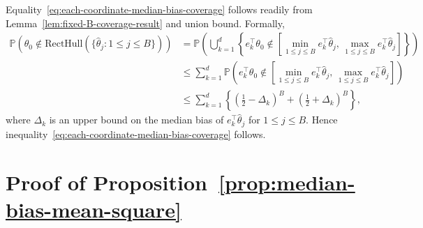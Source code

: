 \documentclass{article}
\numberwithin{myalgctr}{section}
\begin{document}
Equality~\eqref{eq:each-coordinate-median-bias-coverage} follows readily from Lemma~\ref{lem:fixed-B-coverage-result} and union bound. Formally,
\begin{align*}
\mathbb{P}\left(\theta_0 \notin \mbox{RectHull}(\{\widehat{\theta}_j: 1\le j\le B\})\right) &= \mathbb{P}\left(\bigcup_{k=1}^d \left\{e_k^{\top}\theta_0 \notin \left[\min_{1\le j\le B}e_k^{\top}\widehat{\theta}_j,\,\max_{1\le j\le B}e_k^{\top}\widehat{\theta}_j\right]\right\}\right)\\
&\le \sum_{k=1}^d \mathbb{P}\left(e_k^{\top}\theta_0 \notin \left[\min_{1\le j\le B}e_k^{\top}\widehat{\theta}_j,\,\max_{1\le j\le B}e_k^{\top}\widehat{\theta}_j\right]\right)\\
&\le \sum_{k=1}^d \left\{\left(\frac{1}{2} - \Delta_k\right)^{B} + \left(\frac{1}{2} + \Delta_k\right)^B\right\},
\end{align*}
where $\Delta_k$ is an upper bound on the median bias of $e_k^{\top}\widehat{\theta}_j$ for $1\le j\le B$. Hence inequality~\eqref{eq:each-coordinate-median-bias-coverage} follows.


\section{Proof of Proposition~\ref{prop:median-bias-mean-square}}\label{appsec:median-bias-mean-square}
\end{document}
